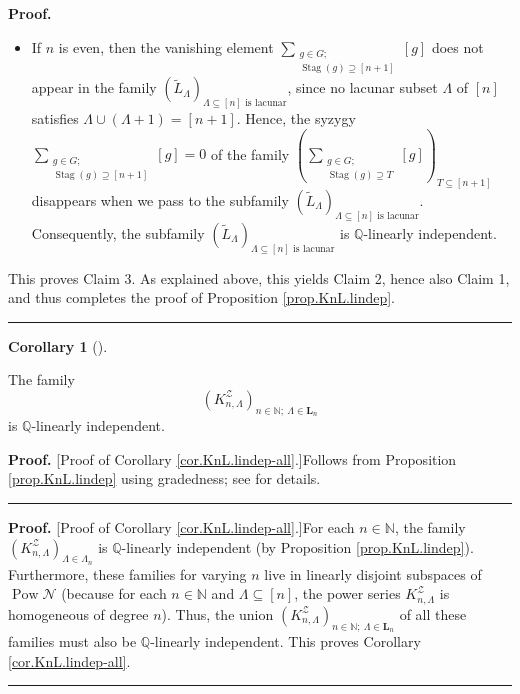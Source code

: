 \documentclass[numbers=enddot,12pt,final,onecolumn,notitlepage]{scrartcl}%
\theoremstyle{definition}
\newtheorem{coro}[theo]{Corollary}
\newenvironment{corollary}[1][]
{\begin{coro}[#1]\begin{leftbar}}
{\end{leftbar}\end{coro}}
\newenvironment{proof}[1][Proof]{\noindent\textbf{#1.} }{\ \rule{0.5em}{0.5em}}
\newenvironment{verlong}{}{}
\newenvironment{vershort}{}{}
\newcommand{\NN}{\mathbb{N}}
\let\sumnonlimits\sum
\renewcommand{\sum}{\sumnonlimits\limits}
\begin{document}
\begin{verlong}
\begin{proof}
\begin{itemize}
\item If $n$ is even, then the vanishing element $\sum_{\substack{g\in
G;\\\operatorname*{Stag}\left(  g\right)  \supseteq\left[  n+1\right]
}}\left[  g\right]  $ does not appear in the family $\left(  \widetilde{L}%
_{\Lambda}\right)  _{\Lambda\subseteq\left[  n\right]  \text{ is lacunar}}$,
since no lacunar subset $\Lambda$ of $\left[  n\right]  $ satisfies
$\Lambda\cup\left(  \Lambda+1\right)  =\left[  n+1\right]  $. Hence, the
syzygy $\sum_{\substack{g\in G;\\\operatorname*{Stag}\left(  g\right)
\supseteq\left[  n+1\right]  }}\left[  g\right]  =0$ of the family $\left(
\sum_{\substack{g\in G;\\\operatorname*{Stag}\left(  g\right)  \supseteq
T}}\left[  g\right]  \right)  _{T\subseteq\left[  n+1\right]  }$ disappears
when we pass to the subfamily $\left(  \widetilde{L}_{\Lambda}\right)
_{\Lambda\subseteq\left[  n\right]  \text{ is lacunar}}$. Consequently, the
subfamily $\left(  \widetilde{L}_{\Lambda}\right)  _{\Lambda\subseteq\left[
n\right]  \text{ is lacunar}}$ is $\mathbb{Q}$-linearly independent.
\end{itemize}

This proves Claim 3. As explained above, this yields Claim 2, hence also Claim
1, and thus completes the proof of Proposition \ref{prop.KnL.lindep}.
\end{proof}
\end{verlong}

\begin{corollary}
\label{cor.KnL.lindep-all}The family%
\[
\left(  K_{n,\Lambda}^{\mathcal{Z}}\right) %
_{n \in \NN; \ \Lambda \in \mathbf{L}_n}
\]
is $\mathbb{Q}$-linearly independent.
\end{corollary}

\begin{vershort}
\begin{proof}
[Proof of Corollary \ref{cor.KnL.lindep-all}.]Follows from Proposition
\ref{prop.KnL.lindep} using gradedness; see \cite{verlong} for details.
\end{proof}
\end{vershort}

\begin{verlong}
\begin{proof}
[Proof of Corollary \ref{cor.KnL.lindep-all}.]For each $n\in\mathbb{N}$, the
family $\left(  K_{n,\Lambda}^{\mathcal{Z}}\right)  _{\Lambda\in \Lambda_n}$
is $\mathbb{Q}$-linearly
independent (by Proposition \ref{prop.KnL.lindep}). Furthermore, these
families for varying $n$ live in linearly disjoint subspaces of
$\operatorname*{Pow}\mathcal{N}$ (because for each $n \in \NN$ and $\Lambda
\subseteq\left[  n\right]  $, the power series $K_{n,\Lambda}^{\mathcal{Z}}$
is homogeneous of degree $n$). Thus, the union $\left(  K_{n,\Lambda
}^{\mathcal{Z}}\right)  _{n \in \NN;\ \Lambda \in \mathbf{L}_n}$ of all
these families must also be $\mathbb{Q}%
$-linearly independent.
This proves Corollary \ref{cor.KnL.lindep-all}.
\end{proof}
\end{verlong}
\end{document}
